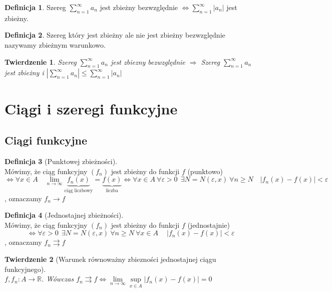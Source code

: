 \documentclass[12pt,a4paper]{article}
\newtheorem{tw}{Twierdzenie}
\theoremstyle{definition}
\newtheorem{df}{Definicja}
\begin{document}
\begin{df}
Szereg $\sum\limits_{n=1}^\infty a_n$ jest zbieżny bezwzględnie $\Leftrightarrow \sum\limits_{n=1}^\infty |a_n|$ jest zbieżny.
\end{df}

\begin{df}
Szereg który jest zbieżny ale nie jest zbieżny bezwzględnie nazywamy zbieżnym warunkowo.
\end{df}

\begin{tw}
Szereg $\sum\limits_{n=1}^\infty a_n$ jest zbiezny bezwzględnie $\Rightarrow$ Szereg $\sum\limits_{n=1}^\infty a_n$ jest zbieżny i $|\sum\limits_{n=1}^\infty a_n| \leqslant \sum\limits_{n=1}^\infty |a_n|$ 
\end{tw}





\section{Ciągi i szeregi funkcyjne}
\subsection{Ciągi funkcyjne}
\begin{df}[Punktowej zbieżności]~\\
Mówimy, że ciąg funkcyjny $(f_n)$ jest zbieżny do funkcji $f$ (punktowo)
 $$\Leftrightarrow \forall x\in A \quad \lim\limits_{n\to\infty}\underbrace{f_n(x)}_{\text{ciąg liczbowy}} = \underbrace{f(x)}_{\text{liczba}} \Leftrightarrow \forall x\in A ~ \forall\varepsilon > 0 ~~ \exists N = N(\varepsilon, x) ~ \forall n \geqslant N \quad |f_n(x)-f(x)| < \varepsilon$$, oznaczamy $f_n \rightarrow f$
\end{df}

\begin{df}[Jednostajnej zbieżności]~\\
Mówimy, że ciąg funkcyjny $(f_n)$ jest zbieżny do funkcji $f$ (jednostajnie) $$\Leftrightarrow \forall\varepsilon > 0 ~~ \exists N = N(\varepsilon, x) ~ \forall n \geqslant N ~ \forall x\in A ~ \quad |f_n(x)-f(x)| < \varepsilon$$, oznaczamy $f_n \rightrightarrows f$
\end{df}

\begin{tw}[Warunek równoważny zbiezności jednostajnej ciągu funkcyjnego]~\\
$f, f_n: A \to \mathbb{R}$. Wówczas $f_n \rightrightarrows f \Leftrightarrow \lim\limits_{n\to\infty} \sup\limits_{x\in A} |f_n(x)-f(x)| = 0$
\end{tw}
\end{document}
